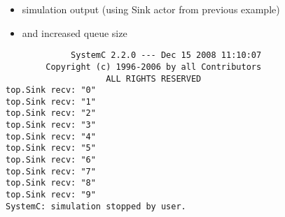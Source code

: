 \begin{frame}[fragile=singleslide]
\begin{itemize}
\item simulation output (using Sink actor from previous example)
\item and increased queue size
\end{itemize}
\begin{lstlisting}
             SystemC 2.2.0 --- Dec 15 2008 11:10:07
        Copyright (c) 1996-2006 by all Contributors
                    ALL RIGHTS RESERVED
top.Sink recv: "0"
top.Sink recv: "1"
top.Sink recv: "2"
top.Sink recv: "3"
top.Sink recv: "4"
top.Sink recv: "5"
top.Sink recv: "6"
top.Sink recv: "7"
top.Sink recv: "8"
top.Sink recv: "9"
SystemC: simulation stopped by user.
\end{lstlisting}
\end{frame}






